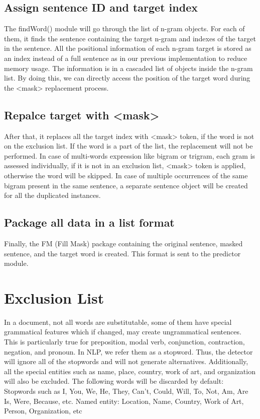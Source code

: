 \documentclass[12pt,oneside,openright,a4paper]{cpe-english-project}
\begin{document}
\subsection{Assign sentence ID and target index}
The findWord() module will go through the list of n-gram objects. For each of them, it finds the sentence containing the target n-gram and indexes of the target in the sentence. All the positional information of each n-gram target is stored as an index instead of a full sentence as in our previous implementation to reduce memory usage. The information is in a cascaded list of objects inside the n-gram list. By doing this, we can directly access the position of the target word during the <mask> replacement process. 
\subsection{Repalce target with <mask>}
After that, it replaces all the target index with <mask> token, if the word is not on the exclusion list. If the word is a part of the list, the replacement will not be performed. In case of multi-words expression like bigram or trigram, each gram is assessed individually, if it is not in an exclusion list, <mask> token is applied, otherwise the word will be skipped. In case of multiple occurrences of the same bigram present in the same sentence, a separate sentence object will be created for all the duplicated instances. 

\subsection{Package all data in a list format}
Finally, the FM (Fill Mask) package containing the original sentence, masked sentence, and the target word is created. This format is sent to the predictor module.

\section{Exclusion List}
In a document, not all words are substitutable, some of them have special grammatical features which if changed, may create ungrammatical sentences. This is particularly true for preposition, modal verb, conjunction, contraction, negation, and pronoun. In NLP, we refer them as a stopword. Thus, the detector will ignore all of the stopwords and will not generate alternatives.  Additionally, all the special entities such as name, place, country, work of art, and organization will also be excluded.
The following words will be discarded by default:
Stopwords such as I, You, We, He, They, Can’t, Could, Will, To, Not, Am, Are Is, Were, Because, etc.
Named entity: Location, Name, Country, Work of Art, Person, Organization, etc
\end{document}
